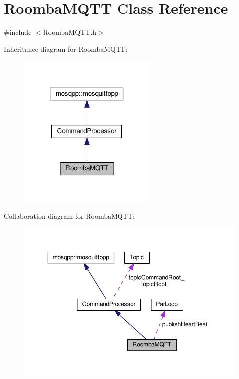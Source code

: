 \hypertarget{class_roomba_m_q_t_t}{}\section{Roomba\+M\+Q\+TT Class Reference}
\label{class_roomba_m_q_t_t}


{\ttfamily \#include $<$Roomba\+M\+Q\+T\+T.\+h$>$}



Inheritance diagram for Roomba\+M\+Q\+TT\+:\nopagebreak
\begin{figure}[H]
\begin{center}
\leavevmode
\includegraphics[width=190pt]{class_roomba_m_q_t_t__inherit__graph}
\end{center}
\end{figure}


Collaboration diagram for Roomba\+M\+Q\+TT\+:\nopagebreak
\begin{figure}[H]
\begin{center}
\leavevmode
\includegraphics[width=350pt]{class_roomba_m_q_t_t__coll__graph}
\end{center}
\end{figure}
